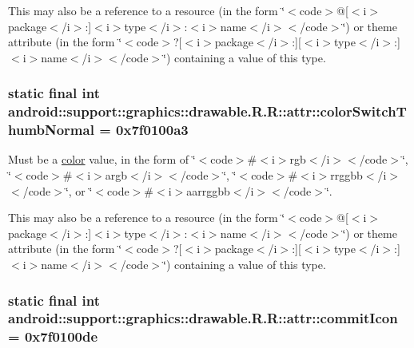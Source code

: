 This may also be a reference to a resource (in the form \char`\"{}$<$code$>$@\mbox{[}$<$i$>$package$<$/i$>$:\mbox{]}$<$i$>$type$<$/i$>$:$<$i$>$name$<$/i$>$$<$/code$>$\char`\"{}) or theme attribute (in the form \char`\"{}$<$code$>$?\mbox{[}$<$i$>$package$<$/i$>$:\mbox{]}\mbox{[}$<$i$>$type$<$/i$>$:\mbox{]}$<$i$>$name$<$/i$>$$<$/code$>$\char`\"{}) containing a value of this type. \hypertarget{classandroid_1_1support_1_1graphics_1_1drawable_1_1_r_1_1attr_efbb6ee9181341dd7236f5f6d89e1efc}{
\subsubsection[{colorSwitchThumbNormal}]{\setlength{\rightskip}{0pt plus 5cm}static final int android::support::graphics::drawable.R.R::attr::colorSwitchThumbNormal = 0x7f0100a3}}
\label{classandroid_1_1support_1_1graphics_1_1drawable_1_1_r_1_1attr_efbb6ee9181341dd7236f5f6d89e1efc}


Must be a \hyperlink{classandroid_1_1support_1_1graphics_1_1drawable_1_1_r_1_1color}{color} value, in the form of \char`\"{}$<$code$>$\#$<$i$>$rgb$<$/i$>$$<$/code$>$\char`\"{}, \char`\"{}$<$code$>$\#$<$i$>$argb$<$/i$>$$<$/code$>$\char`\"{}, \char`\"{}$<$code$>$\#$<$i$>$rrggbb$<$/i$>$$<$/code$>$\char`\"{}, or \char`\"{}$<$code$>$\#$<$i$>$aarrggbb$<$/i$>$$<$/code$>$\char`\"{}. 

This may also be a reference to a resource (in the form \char`\"{}$<$code$>$@\mbox{[}$<$i$>$package$<$/i$>$:\mbox{]}$<$i$>$type$<$/i$>$:$<$i$>$name$<$/i$>$$<$/code$>$\char`\"{}) or theme attribute (in the form \char`\"{}$<$code$>$?\mbox{[}$<$i$>$package$<$/i$>$:\mbox{]}\mbox{[}$<$i$>$type$<$/i$>$:\mbox{]}$<$i$>$name$<$/i$>$$<$/code$>$\char`\"{}) containing a value of this type. \hypertarget{classandroid_1_1support_1_1graphics_1_1drawable_1_1_r_1_1attr_3f7941deb851288eeb9f35cd76feca3a}{
\subsubsection[{commitIcon}]{\setlength{\rightskip}{0pt plus 5cm}static final int android::support::graphics::drawable.R.R::attr::commitIcon = 0x7f0100de}}
\label{classandroid_1_1support_1_1graphics_1_1drawable_1_1_r_1_1attr_3f7941deb851288eeb9f35cd76feca3a}


